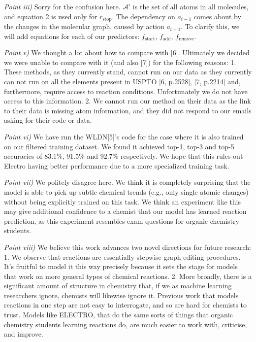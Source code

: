 \documentclass{article}
\begin{document}

\emph{Point iii)} 
Sorry for the confusion here. $\mathcal{A}’$ is the set of all atoms in all molecules, and equation 2 is used only for $r_\textrm{stop}$.
The dependency on $a_{t-1}$ comes about by the changes in the molecular graph, caused by action $a_{t-1}$. 
To clarify this, we will add equations for each of our predictors: $f_\textrm{start}$, $f_\textrm{add}$, $f_\textrm{remove}$.

\emph{Point v)} 
We thought a lot about how to compare with [6]. Ultimately we decided we were unable to compare with it (and also [7]) for the following reasons: 1.
 These methods, as they currently stand, cannot run on our data as they currently can not run on all the elements present in USPTO [6, p.2528], [7, p.2214] and, furthermore, require access to reaction conditions. 
 Unfortunately we do not have access to this information. 2. We cannot run our method on their data as the link to their data is missing atom information, and they did not respond to our emails asking for their code or data. 

\emph{Point vi)} We have run the WLDN[5]'s code for the case where it is also trained on our filtered training dataset.
 We found it achieved top-1, top-3 and top-5 accuracies of 83.1\%, 91.5\% and 92.7\% respectively. 
 We hope that this rules out Electro having better performance due to a more specialized training task.
  
\emph{Point vii)}
 We politely disagree here. We think it is completely surprising that the model is able to pick up subtle chemical trends (e.g., only single atomic changes) without being explicitly trained on this task. We think an experiment like this may give additional confidence to a chemist that our model has learned reaction prediction, as this experiment resembles exam questions for organic chemistry students. 
 
\emph{Point viii)}
We believe this work advances two novel directions for future research: 1. We observe that reactions are essentially stepwise graph-editing procedures. It’s fruitful to model it this way precisely because it sets the stage for models that work on more general types of chemical reactions. 2. More broadly, there is a significant amount of structure in chemistry that, if we as machine learning researchers ignore, chemists will likewise ignore it. Previous work that models reactions in one step are not easy to interrogate, and so are hard for chemists to trust. Models like ELECTRO, that do the same sorts of things that organic chemistry students learning reactions do, are much easier to work with, criticise, and improve.
\end{document}
